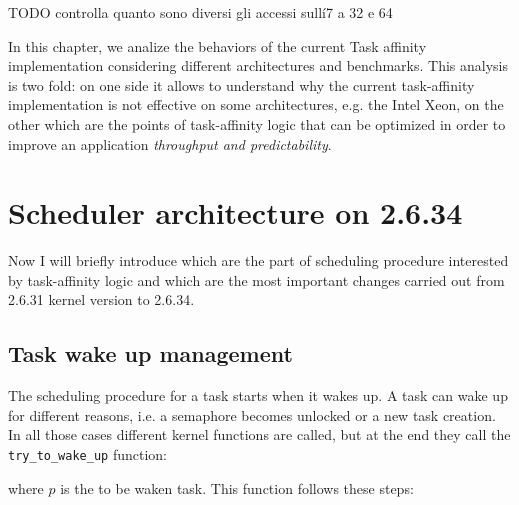 TODO controlla quanto sono diversi gli accessi sull\'i7 a 32 e 64

In this chapter, we analize the behaviors of the current Task affinity
implementation considering different architectures and benchmarks.  This
analysis is two fold: on one side it allows to understand why the current
task-affinity implementation is not effective on some architectures, e.g. the
Intel Xeon, on the other which are the points of task-affinity logic that can be
optimized in order to improve an application \emph{throughput and
predictability}.

\section{Scheduler architecture on 2.6.34}

Now I will briefly introduce which are the part of scheduling procedure 
interested by task-affinity logic and which are the most important changes 
carried out from 2.6.31 kernel version to 2.6.34.

\subsection{Task wake up management}

The scheduling procedure for a task starts when it wakes up. A task can wake up
for different reasons, i.e. a semaphore becomes unlocked or a new task creation.  In all those cases different
kernel functions are called, but at the end they call the
\texttt{try\_to\_wake\_up} function:

\lstset{basicstyle=\footnotesize, language=c, captionpos=b, frame=single, label=lis:APIttwu}


where $p$ is the to be waken task.
This function follows these steps:

